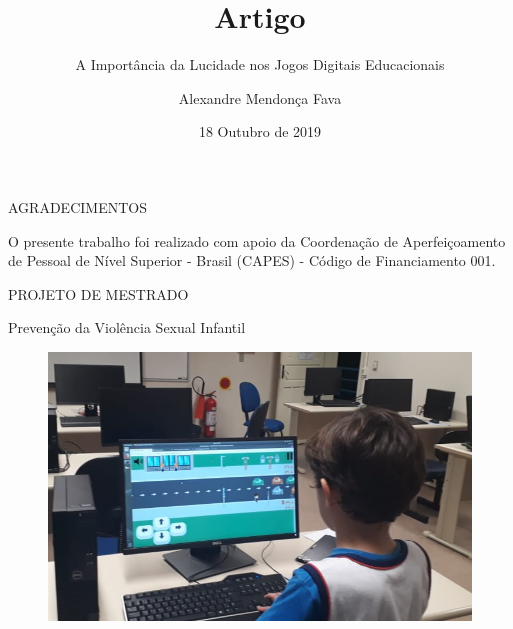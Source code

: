 \documentclass{Alexandre}
\title{Artigo}
\subtitle{A Importância da Lucidade nos Jogos Digitais Educacionais}
\author{Alexandre Mendonça Fava\inst{1}}
\institute[UDESC]{
  \newline \newline \newline
  \inst{1}
  Mestrado Acadêmico em Computação Aplicada - PPGCA
}
\date{18 Outubro de 2019}
\begin{document}
\begin{frame}
  \titlepage
\end{frame}


\begin{frame}{AGRADECIMENTOS}

    O presente trabalho foi realizado com apoio da Coordenação de Aperfeiçoamento de Pessoal de Nível Superior - Brasil (CAPES) - Código de Financiamento 001. 

\end{frame}


\begin{frame}{PROJETO DE MESTRADO}
    \begin{center}
        Prevenção da Violência Sexual Infantil
    \end{center}
    
    \begin{figure}
        \includegraphics[scale = 0.4]{Figuras/MeninoJogando.png}
    \end{figure}

\end{frame}
\end{document}
